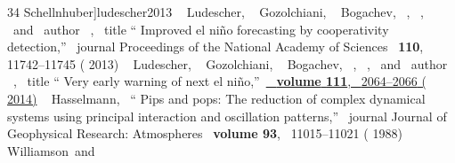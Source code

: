 \documentclass[%
aip,
amsmath,amssymb,
reprint,%
]{revtex4-1}
\begin{document}
\begin{thebibliography}{34}
{		{Schellnhuber}}]{ludescher2013}%
	\BibitemOpen
	 { {~\bibnamefont
			{Ludescher}},  {~\bibnamefont
			{Gozolchiani}},  {\ \bibnamefont
			{Bogachev}},  {~},
		 {~}, \ and\ \bibinfo
		{author} {\ },\ }\bibfield
	{title} {\enquote { {Improved el ni{\~n}o forecasting by
				cooperativity detection},}\ }\href@noop {} { {\bibinfo
			{journal} {Proceedings of the National Academy of Sciences}\ }\textbf
		{ {110}},\  {11742--11745} (
		{2013})}%
	\BibitemOpen
	 { {~\bibnamefont
			{Ludescher}},  {~\bibnamefont
			{Gozolchiani}},  {\ \bibnamefont
			{Bogachev}},  {~},
		 {~}, \ and\ \bibinfo
		{author} {\ },\ }\bibfield
	{title} {\enquote { {Very early warning of next el
				ni{\~n}o},}\ }\href {\doibase 10.1073/pnas.1323058111} {\ \textbf {\bibinfo
			{volume} {111}},\  {2064--2066} (
		{2014})}%
	\BibitemOpen
	 { {~\bibnamefont
			{Hasselmann}},\ } {\enquote { {Pips and
				pops: The reduction of complex dynamical systems using principal interaction
				and oscillation patterns},}\ }\href@noop {} { {\bibinfo
			{journal} {Journal of Geophysical Research: Atmospheres}\ }\textbf {\bibinfo
			{volume} {93}},\  {11015--11021} (
		{1988})}%
	\BibitemOpen
	 { {\ \bibnamefont
			{Williamson}}\ and\  {\ \bibnamefont
}}
\end{thebibliography}
\end{document}
